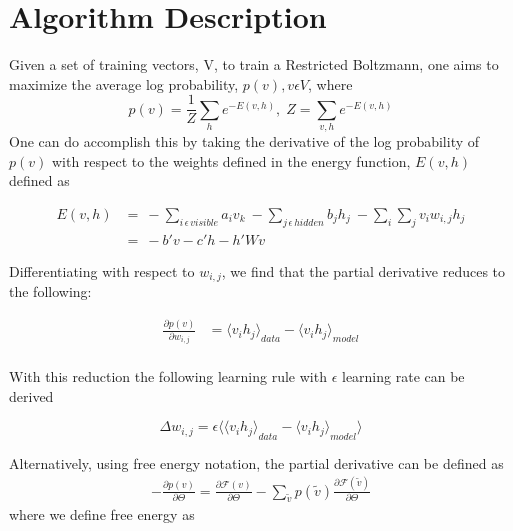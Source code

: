 \documentclass[journal]{IEEEtran}
\begin{document}
\section{Algorithm Description}
Given a set of training vectors, V, to train a Restricted Boltzmann, one aims to maximize the average log probability, $p(v), v \epsilon V$, where
\begin{equation}
p(v) = \frac{1}{Z} \sum\limits_{h} e^{-E(v,h)},\;
Z = \sum\limits_{v,h} e^{-E(v,h)}
\end{equation}
One can do accomplish this by taking the derivative of the log probability of $p(v)$ with respect to the weights defined in the energy function, $E(v,h)$ defined as

\begin{equation}
\begin{aligned}
E(v,h) &= \:- \sum\limits_{i \, \epsilon \, visible} a_{i}v_{k} \: - \sum\limits_{j \, \epsilon \, hidden} b_{j}h_{j} \: - \sum\limits_{i}\sum\limits_{j} v_{i}w_{i,j}h_{j}\\
&=\: -b'v - c'h - h'Wv
\end{aligned}
\end{equation}

Differentiating with respect to $w_{i,j}$, we find that the partial derivative reduces to the following:

\begin{equation}
\begin{aligned}
\frac{\partial p(v)}{\partial w_{i,j}} & = {\langle v_{i} h_{j} \rangle}_{data} - {\langle v_{i} h_{j} \rangle}_{model} \\
\end{aligned}
\end{equation}

With this reduction the following learning rule with $\epsilon$ learning rate can be derived

\begin{equation}
\Delta w_{i,j} = \epsilon\langle{\langle v_{i} h_{j} \rangle}_{data} - {\langle v_{i} h_{j} \rangle}_{model}\rangle 
\end{equation} 

Alternatively, using free energy notation, the partial derivative can be defined as
\begin{equation}
\begin{aligned}
- \frac{\partial p(v)}{\partial \Theta} = \frac{\partial \mathcal{F}(v)}{\partial \Theta} - \sum\limits_{\tilde{v}}p(\tilde{v}) \frac{\partial \mathcal{F}(\tilde{v})}{\partial \Theta}
\end{aligned}
\end{equation} where we define free energy as 
\end{document}
